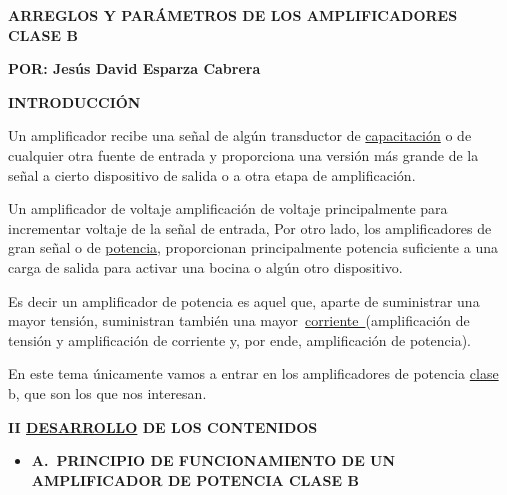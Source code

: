 \documentclass[12pt]{article}
\begin{document}
\setlength{\parskip}{6.0pt}
{\fontsize{18pt}{21.6pt}\selectfont \textbf{ARREGLOS Y PARÁMETROS DE LOS AMPLIFICADORES CLASE B}\par}\par

\textbf{POR: Jesús David Esparza Cabrera}\par


\vspace{\baselineskip}
{\fontsize{18pt}{21.6pt}\selectfont \textbf{ INTRODUCCIÓN}\par}\par

Un amplificador recibe una señal de algún transductor de \href{https://www.monografias.com/trabajos/adpreclu/adpreclu.shtml}{capacitación} o de cualquier otra fuente de entrada y proporciona una versión más grande de la señal a cierto dispositivo de salida o a otra etapa de amplificación.\par

Un amplificador de voltaje amplificación de voltaje principalmente para incrementar voltaje de la señal de entrada, Por otro lado, los amplificadores de gran señal o de \href{https://www.monografias.com/trabajos14/trmnpot/trmnpot.shtml}{potencia}, proporcionan principalmente potencia suficiente a una carga de salida para activar una bocina o algún otro dispositivo.\par

Es decir un amplificador de potencia es aquel que, aparte de suministrar una mayor tensión, suministran también una mayor \href{http://www.unicrom.com/Tut_corriente_electrica.asp}{corriente }(amplificación de tensión y amplificación de corriente y, por ende, amplificación de potencia).\par

En este tema únicamente vamos a entrar en los amplificadores de potencia \href{https://www.monografias.com/trabajos901/debate-multicultural-etnia-clase-nacion/debate-multicultural-etnia-clase-nacion.shtml}{clase} b, que son los que nos interesan.\par

{\fontsize{18pt}{21.6pt}\selectfont \textbf{II \href{https://www.monografias.com/trabajos12/desorgan/desorgan.shtml}{DESARROLLO} DE LOS CONTENIDOS}\par}\par

\begin{itemize}
	\item \textbf{A. PRINCIPIO DE FUNCIONAMIENTO DE UN AMPLIFICADOR DE POTENCIA CLASE B}
\end{itemize}\par
\end{document}
